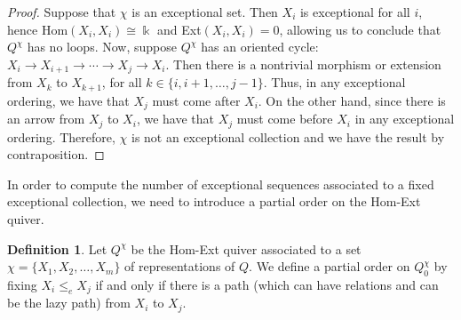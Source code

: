 \documentclass[12pt]{amsart}
\theoremstyle{plain}
\theoremstyle{definition}
\newtheorem{defn}{Definition}[section]
\theoremstyle{remark}
\begin{document}
\begin{proof}


Suppose that $\chi$ is an exceptional set. Then $X_i$ is exceptional for all $i$, hence Hom$(X_i,X_i) \cong \Bbbk$ and Ext$(X_i,X_i) =0$, allowing us to conclude that $Q^{\chi}$ has no loops. Now, suppose $Q^{\chi}$ has an oriented cycle: $X_i \rightarrow X_{i+1} \rightarrow \cdots \rightarrow X_j \rightarrow X_i$. Then there is a nontrivial morphism or extension from $X_k$ to $X_{k+1}$, for all $k \in \{i, i+1, \dots, j-1\}$. Thus, in any exceptional ordering, we have that $X_j$ must come after $X_i$. On the other hand, since there is an arrow from $X_j$ to $X_i$, we have that $X_j$ must come before $X_i$ in any exceptional ordering. Therefore, $\chi$ is not an exceptional collection and we have the result by contraposition.
\end{proof}


In order to compute the number of exceptional sequences associated to a fixed exceptional collection, we need to introduce a partial order on the Hom-Ext quiver.

\begin{defn}\label{defn: partial order}
{\color{black} Let $Q^{\chi}$ be the Hom-Ext quiver associated to a set $\chi = \{X_1, X_2, \dots, X_m\}$ of representations of $Q$.} We define a partial order on $Q^{\chi}_0$ by fixing $X_i \leq_e X_j$ if and only if there is a path (which can have relations and can be the lazy path) from $X_i$ to $X_j$.
\end{defn}
\end{document}
